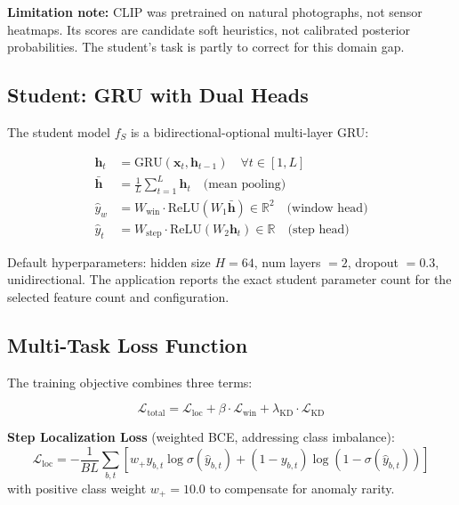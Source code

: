 \documentclass[10pt,twocolumn]{article}
\begin{document}
\textbf{Limitation note:} CLIP was pretrained on natural photographs, not sensor heatmaps. Its scores are candidate soft heuristics, not calibrated posterior probabilities. The student's task is partly to correct for this domain gap.

\subsection{Student: GRU with Dual Heads}

The student model $f_S$ is a bidirectional-optional multi-layer GRU:

\begin{align}
\mathbf{h}_t &= \text{GRU}(\mathbf{x}_t, \mathbf{h}_{t-1}) \quad \forall t \in [1, L] \\
\bar{\mathbf{h}} &= \frac{1}{L}\sum_{t=1}^{L} \mathbf{h}_t \quad \text{(mean pooling)}\\
\hat{y}_w &= W_{\text{win}} \cdot \text{ReLU}(W_1 \bar{\mathbf{h}}) \in \mathbb{R}^2 \quad \text{(window head)}\\
\hat{y}_t &= W_{\text{step}} \cdot \text{ReLU}(W_2 \mathbf{h}_t) \in \mathbb{R} \quad \text{(step head)}
\end{align}

Default hyperparameters: hidden size $H = 64$, num layers $= 2$, dropout $= 0.3$, unidirectional. The application reports the exact student parameter count for the selected feature count and configuration.

\subsection{Multi-Task Loss Function}
\label{sec:losses}

The training objective combines three terms:

\begin{equation}
\mathcal{L}_{\text{total}} = \mathcal{L}_{\text{loc}} + \beta \cdot \mathcal{L}_{\text{win}} + \lambda_{\text{KD}} \cdot \mathcal{L}_{\text{KD}}
\end{equation}

\textbf{Step Localization Loss} (weighted BCE, addressing class imbalance):
\begin{equation}
\mathcal{L}_{\text{loc}} = -\frac{1}{BL}\sum_{b,t} \left[ w_+ y_{b,t} \log \sigma(\hat{y}_{b,t}) + (1 - y_{b,t}) \log(1 - \sigma(\hat{y}_{b,t}))\right]
\end{equation}
with positive class weight $w_+ = 10.0$ to compensate for anomaly rarity.
\end{document}
